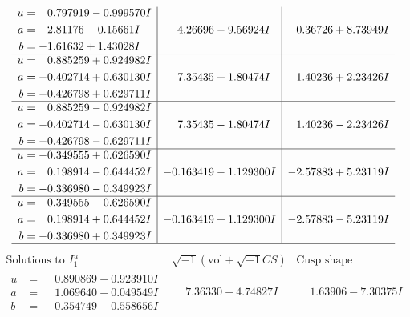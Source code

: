 \documentclass[1p]{elsarticle_modified}
\theoremstyle{definition}
\newcommand{\I}{\sqrt{-1}}
\begin{document}
$$\begin{array}{c|c|c}
\begin{aligned}
u &= \phantom{-}0.797919 - 0.999570 I \\
a &= -2.81176 - 0.15661 I \\
b &= -1.61632 + 1.43028 I\end{aligned}
 & \phantom{-}4.26696 - 9.56924 I & \phantom{-}0.36726 + 8.73949 I \\ \hline\begin{aligned}
u &= \phantom{-}0.885259 + 0.924982 I \\
a &= -0.402714 + 0.630130 I \\
b &= -0.426798 + 0.629711 I\end{aligned}
 & \phantom{-}7.35435 + 1.80474 I & \phantom{-}1.40236 + 2.23426 I \\ \hline\begin{aligned}
u &= \phantom{-}0.885259 - 0.924982 I \\
a &= -0.402714 - 0.630130 I \\
b &= -0.426798 - 0.629711 I\end{aligned}
 & \phantom{-}7.35435 - 1.80474 I & \phantom{-}1.40236 - 2.23426 I \\ \hline\begin{aligned}
u &= -0.349555 + 0.626590 I \\
a &= \phantom{-}0.198914 - 0.644452 I \\
b &= -0.336980 - 0.349923 I\end{aligned}
 & -0.163419 - 1.129300 I & -2.57883 + 5.23119 I \\ \hline\begin{aligned}
u &= -0.349555 - 0.626590 I \\
a &= \phantom{-}0.198914 + 0.644452 I \\
b &= -0.336980 + 0.349923 I\end{aligned}
 & -0.163419 + 1.129300 I & -2.57883 - 5.23119 I\\
 \hline 
 \end{array}$$\newpage$$\begin{array}{c|c|c}  
\text{Solutions to }I^u_{1}& \I (\text{vol} + \sqrt{-1}CS) & \text{Cusp shape}\\
 \hline 
\begin{aligned}
u &= \phantom{-}0.890869 + 0.923910 I \\
a &= \phantom{-}1.069640 + 0.049549 I \\
b &= \phantom{-}0.354749 + 0.558656 I\end{aligned}
 & \phantom{-}7.36330 + 4.74827 I & \phantom{-}1.63906 - 7.30375 I \\ \hline\begin{aligned}

\end{aligned}
\end{array}$$
\end{document}
